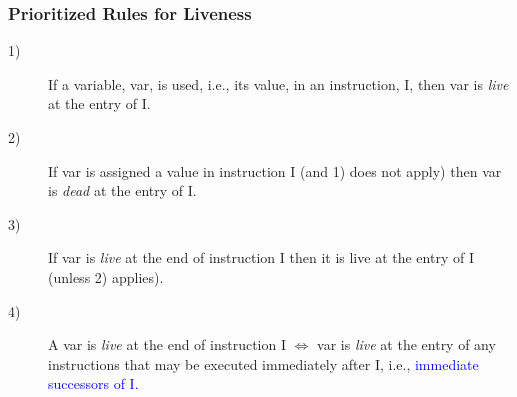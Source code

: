 \documentclass{beamer}
\newcommand{\blue}[1]{\textcolor{Blue}{{#1}}}
\renewcommand{\emph}[1]{\textcolor{structure}{#1}}
\newcommand{\emp}[1]{\textcolor{DikuRed}{ #1}}
\begin{document}
\begin{frame}[fragile,t]
   \frametitle{Prioritized Rules for Liveness}

\bigskip

\begin{description}

    \item[1)] If a variable, {\sc var}, is used, i.e., its value, in an instruction, I,
                \emph{then {\sc var} is {\em live} at the entry of I.}\bigskip

    \item[2)] If {\sc var} is assigned a value in instruction I (and \emph{1)} does not
                apply) \emp{then {\sc var} is {\em dead} at the entry of I.}\bigskip

    \item[3)] If {\sc var} is {\em live} at the end of instruction I \emph{then it is live at the
                entry of I} (unless \emph{2)} applies).\bigskip

    \item[4)] \emph{A {\sc var} is {\em live} at the end of instruction I} $\Leftrightarrow$ 
                \emp{{\sc var} is {\em live} at the
                entry of any instructions that may be executed
                immediately after I}, i.e., \blue{immediate successors of I.}

\end{description}

\end{frame}
\end{document}
